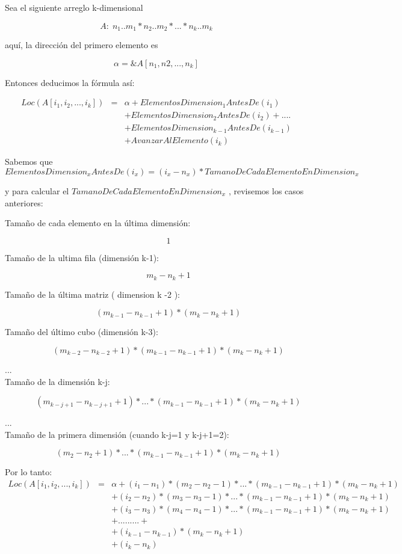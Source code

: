 Sea el siguiente arreglo k-dimensional

$$A:\;n_1..m_1 * n_2..m_2 * ... * n_k..m_k$$

aquí, la dirección del primero elemento es

$$ \alpha = \&A[n_1, n2,..., n_k]$$

Entonces deducimos la fórmula así:

\begin{eqnarray*}
  Loc \left( A[i_1, i_2, ... ,i_k] \right) &=& \alpha + ElementosDimension_1AntesDe(i_1)\\
  & & + ElementosDimension_2AntesDe( i_2)+ .... \\
  & & + ElementosDimension_{k-1}AntesDe (i_{k-1}) \\
  & & + AvanzarAlElemento(i_k)
\end{eqnarray*}

Sabemos que
$$ElementosDimension_xAntesDe(i_x) = (i_x -  n_x) * TamanoDeCadaElementoEnDimension_x$$

y para calcular el $TamanoDeCadaElementoEnDimension_x$ , revisemos los
casos anteriores:

\begin{description}
\item[Tamaño de cada elemento en la última dimensión: ]
  $$1$$
\item[Tamaño de la ultima fila (dimensión k-1): ]
  $$ m_k - n_k + 1$$
\item[Tamaño de la última matriz ( dimension k -2 ): ]
  $$(m_{k-1} - n_{k-1} + 1) * (m_k - n_k + 1) $$
\item[Tamaño del último cubo (dimensión k-3): ]
  $$(m_{k-2} - n_{k-2} + 1) * (m_{k-1} - n_{k-1} + 1) * (m_k - n_k + 1) $$
\item[...]
\item[Tamaño de la dimensión k-j: ]
  $$(m_{k-j+1} - n_{k-j+1} +1) * ...* (m_{k-1} - n_{k-1} + 1) * (m_k - n_k + 1) $$
\item[...]
\item[Tamaño de la primera dimensión (cuando k-j=1 y k-j+1=2): ]
  $$(m_2 - n_2 +1) * ...* (m_{k-1} - n_{k-1} + 1) * (m_k - n_k + 1)$$
\end{description}

Por lo tanto:
\begin{eqnarray*}
  Loc (A[i_1, i_2, ... ,i_k]) &=& \alpha + (i_1 - n_1) *(m_2 - n_2 -1) * ...* (m_{k-1} - n_{k-1} + 1) * (m_k - n_k + 1)\\
  & & + (i_2 - n_2) *(m_3 - n_3 -1) * ...* (m_{k-1} - n_{k-1} + 1) * (m_k - n_k + 1)\\
  & & + (i_3 - n_3) *(m_4 - n_4 -1) * ...* (m_{k-1} - n_{k-1} + 1) * (m_k - n_k + 1)\\
  & & +.........+\\
  & & + (i_{k-1} - n_{k-1}) * (m_k - n_k + 1)\\
  & & + (i_k - n_k) 
\end{eqnarray*}

